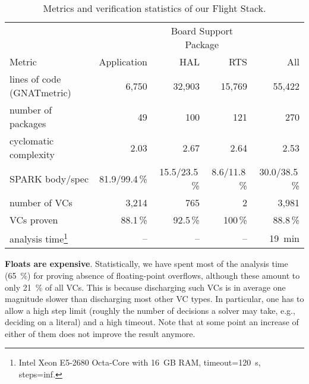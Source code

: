 \bgroup
\setlength\tabcolsep{.5em}
\begin{table}[htbp]\vspace*{-9mm}
\begin{minipage}{\linewidth}
  \centering
  \caption{Metrics and verification statistics of our Flight Stack.}
  \small
  \begin{tabular}{lrrrr}
    \toprule
    &               & \multicolumn{2}{c}{\scriptsize{Board Support Package}} & \\
                         \cmidrule{3-4}
    Metric                      & {Application} & {HAL}         & RTS          & {All}\\
    \midrule
    lines of code (GNATmetric)  & 6,750         & 32,903        & 15,769       & 55,422   \\
    number of packages          & 49            & 100           & 121          & 270      \\
    cyclomatic complexity       & 2.03          & 2.67          & 2.64         & 2.53      \\
    SPARK body/spec             & 81.9/99.4\,\% & 15.5/23.5\,\% & 8.6/11.8\,\% & 30.0/38.5\,\%  \\ 
    \midrule
    number of VCs               & 3,214         & 765      & 2       & 3,981      \\
    VCs proven                  & 88.1\,\%      & 92.5\,\% & 100\,\% & 88.8\,\%   \\
    analysis time\footnote{Intel Xeon E5-2680 Octa-Core with \SI{16}{GB} RAM, timeout=\SI{120}{\second}, steps=inf.}  & --        & --        & -- & \SI{19}{\minute} \\
    \bottomrule
  \end{tabular}\label{tab:complexity}
\end{minipage}
\vspace*{-4mm}
\end{table}
\egroup


\textbf{Floats are expensive}. Statistically, we have spent most
  of the analysis time (\SI{65}{\percent}) for proving absence of floating-point
  overflows, although these amount to only \SI{21}{\percent} of all VCs. This is
  because discharging such VCs is in average one
  magnitude slower than discharging most other VC types. In particular, one has
  to allow a high step limit (roughly the number of
  decisions a solver may take, e.g., deciding on a literal) and a
  high timeout. Note that at some point an increase of either of them does not improve 
  the result anymore.%

